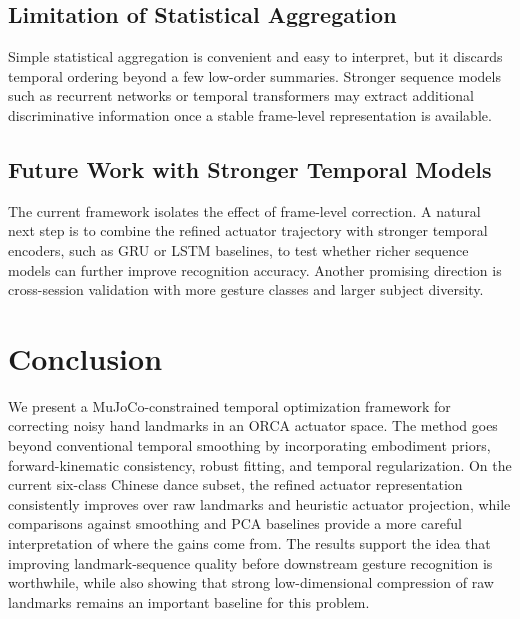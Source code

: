 \documentclass[11pt]{article}
\begin{document}
\subsection{Limitation of Statistical Aggregation}
Simple statistical aggregation is convenient and easy to interpret, but it discards temporal ordering beyond a few low-order summaries. Stronger sequence models such as recurrent networks or temporal transformers may extract additional discriminative information once a stable frame-level representation is available.

\subsection{Future Work with Stronger Temporal Models}
The current framework isolates the effect of frame-level correction. A natural next step is to combine the refined actuator trajectory with stronger temporal encoders, such as GRU or LSTM baselines, to test whether richer sequence models can further improve recognition accuracy. Another promising direction is cross-session validation with more gesture classes and larger subject diversity.

\section{Conclusion}
We present a MuJoCo-constrained temporal optimization framework for correcting noisy hand landmarks in an ORCA actuator space. The method goes beyond conventional temporal smoothing by incorporating embodiment priors, forward-kinematic consistency, robust fitting, and temporal regularization. On the current six-class Chinese dance subset, the refined actuator representation consistently improves over raw landmarks and heuristic actuator projection, while comparisons against smoothing and PCA baselines provide a more careful interpretation of where the gains come from. The results support the idea that improving landmark-sequence quality before downstream gesture recognition is worthwhile, while also showing that strong low-dimensional compression of raw landmarks remains an important baseline for this problem.
\end{document}

